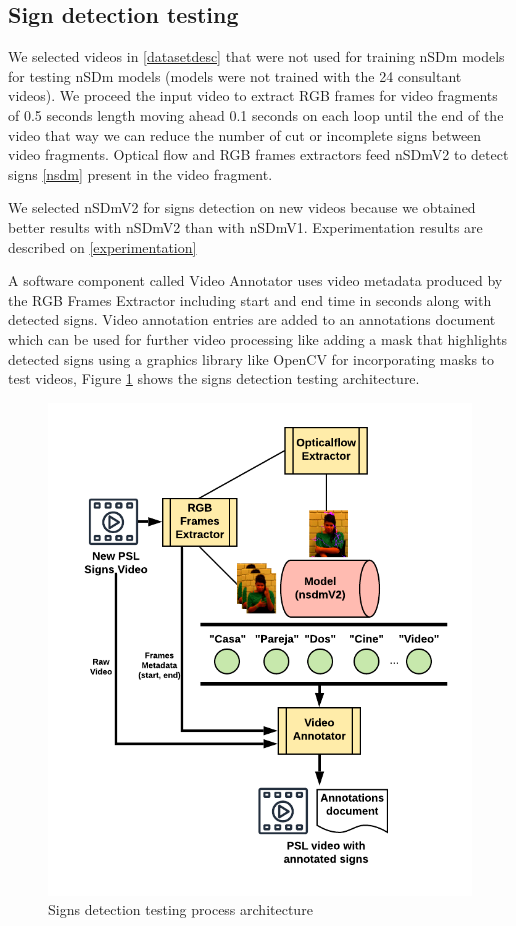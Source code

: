 \documentclass[twocolumn,conference]{article}
\begin{document}
\subsection{Sign detection testing}\label{new-videos-testing}
We selected videos in \ref{datasetdesc} that were not used for training nSDm models for testing nSDm models (models were not trained with the 24 consultant videos). We proceed the input video to extract RGB frames for video fragments of 0.5 seconds length moving ahead 0.1 seconds on each loop until the end of the video that way we can reduce the number of cut or incomplete signs between video fragments. Optical flow and RGB frames extractors feed nSDmV2 to detect signs \ref{nsdm} present in the video fragment.

We selected nSDmV2 for signs detection on new videos because we obtained better results with nSDmV2 than with nSDmV1. Experimentation results are described on \ref{experimentation}

A software component called Video Annotator uses video metadata produced by the RGB Frames Extractor including start and end time in seconds along with detected signs. Video annotation entries are added to an annotations document which can be used for further video processing like adding a mask that highlights detected signs using a graphics library like OpenCV for incorporating masks to test videos, Figure \ref{fig:video-testing-architecture} shows the signs detection testing architecture.
\begin{figure}[hbt!]
\centering
\includegraphics[scale=1.0]{images/new-video-test-architecture.png}
\caption{Signs detection testing process architecture}
\label{fig:video-testing-architecture}
\end{figure}
\end{document}
